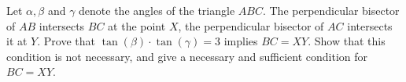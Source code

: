 Let $\alpha, \beta$ and $\gamma$ denote the angles of the triangle $ABC$. The perpendicular bisector of $AB$ intersects $BC$ at the point $X$,  the perpendicular bisector of $AC$ intersects it at $Y$. Prove that $\tan(\beta) \cdot \tan(\gamma) = 3$ implies $BC= XY$. Show that this condition is not necessary, and give a necessary and sufficient condition for $BC = XY$.
